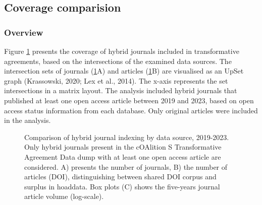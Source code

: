 \documentclass[a4paper,man,floatsintext,longtable,noextraspace,10pt]{apa6}
\begin{document}
\subsection{Coverage comparision}\label{coverage-comparision}

\subsubsection{Overview}\label{overview}

Figure \ref{fig-upset_coverage_results} presents the coverage of hybrid
journals included in transformative agreements, based on the
intersections of the examined data sources. The intersection sets of
journals (\ref{fig-upset_coverage_results}A) and articles
(\ref{fig-upset_coverage_results}B) are visualised as an UpSet graph
(Krassowski, 2020; Lex et al., 2014). The x-axis represents the set
intersections in a matrix layout. The analysis included hybrid journals
that published at least one open access article between 2019 and 2023,
based on open access status information from each database. Only
original articles were included in the analysis.

\begin{figure}[ht!]


\caption{\label{fig-upset_coverage_results}Comparison of hybrid journal
indexing by data source, 2019-2023. Only hybrid journals present in the
cOAlition S Transformative Agreement Data dump with at least one open
access article are considered. A) presents the number of journals, B)
the number of articles (DOI), distinguishing between shared DOI corpus
and surplus in hoaddata. Box plots (C) shows the five-years journal
article volume (log-scale).}

\end{figure}%
\end{document}
